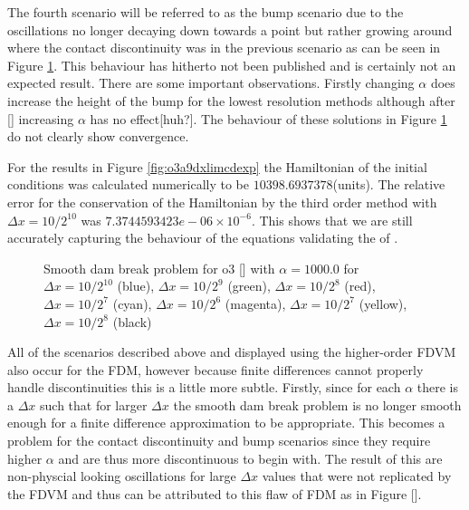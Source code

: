 \documentclass[SingleSpace,12pt,Proceedings]{Serre_ASCE}
\begin{document}
The fourth scenario will be referred to as the bump scenario due to the oscillations no longer decaying down towards a point but rather growing around where the contact discontinuity was in the previous scenario as can be seen in Figure \ref{fig:o3a20dxlimcdexp}. This behaviour has hitherto not been published and is certainly not an expected result. There are some important observations. Firstly changing $\alpha$ does increase the height of the bump for the lowest resolution methods although after [] increasing $\alpha$ has no effect[huh?]. The behaviour of these solutions in Figure \ref{fig:o3a20dxlimcdexp} do not clearly show convergence.

For the results in Figure \ref{fig:o3a9dxlimcdexp} the Hamiltonian of the initial conditions was calculated numerically to be $10398.6937378$(units). The relative error for the conservation of the Hamiltonian by the third order method with $\Delta x = 10/2^{10}$ was $7.3744593423e-06 \times 10^{-6}$. This shows that we are still accurately capturing the behaviour of the equations validating the of .


\begin{figure}
\centering
{}
\caption{Smooth dam break problem for o3 [] with $\alpha = 1000.0$ for $\Delta x = 10/2^{10}$ (blue), $\Delta x = 10/2^9$ (green), $\Delta x = 10/2^8$ (red), $\Delta x = 10/2^7$ (cyan), $\Delta x = 10/2^6$ (magenta), $\Delta x = 10/2^7$ (yellow), $\Delta x = 10/2^{8}$ (black)}
\label{fig:o3a20dxlimcdexp}
\end{figure}

All of the scenarios described above and displayed using the higher-order FDVM also occur for the FDM, however because finite differences cannot properly handle discontinuities this is a little more subtle. Firstly, since for each $\alpha$ there is a $\Delta x$ such that for larger $\Delta x$ the smooth dam break problem is no longer smooth enough for a finite difference approximation to be appropriate. This becomes a problem for the contact discontinuity and bump scenarios since they require higher $\alpha$ and are thus more discontinuous to begin with. The result of this are non-physcial looking oscillations for large $\Delta x$ values that were not replicated by the FDVM and thus can be attributed to this flaw of FDM as in Figure []. 
\end{document}
